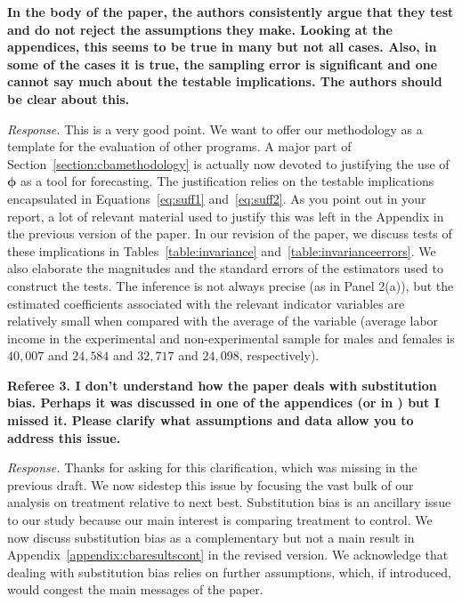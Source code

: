 \noindent \textbf{In the body of the paper, the authors consistently argue that they test and do not reject the assumptions they make. Looking at the appendices, this seems to be true in many but not all cases. Also, in some of the cases it is true, the sampling error is significant and one cannot say much about the testable implications. The authors should be clear about this.}

\noindent \textit{Response.} This is a very good point. We want to offer our methodology as a template for the evaluation of other programs. A major part of Section~\ref{section:cbamethodology} is actually now devoted to justifying the use of $\bm{\phi}$ as a tool for forecasting. The justification relies on the testable implications encapsulated in Equations~\eqref{eq:suff1} and~\eqref{eq:suff2}. As you point out in your report, a lot of relevant material used to justify this was left in the Appendix in the previous version of the paper. In our revision of the paper, we discuss tests of these implications in Tables~\ref{table:invariance} and~\ref{table:invarianceerrors}. We also elaborate the magnitudes and the standard errors of the estimators used to construct the tests. The inference is not always precise (as in Panel 2(a)), but the estimated coefficients associated with the relevant indicator variables are relatively small when compared with the average of the variable (average labor income in the experimental and non-experimental sample for males and females is $40,007$ and $24,584$ and  $32,717$ and $24,098$, respectively).

\noindent \textbf{Referee 3. I don't understand how the paper deals with substitution bias. Perhaps it was discussed in one of the appendices (or in \citet{Garcia_Heckman_Ziff_2017_Gender-Diff_UNPUBLISHED}) but I missed it. Please clarify what assumptions and data allow you to address this issue.}

\noindent \textit{Response.} Thanks for asking for this clarification, which was missing in the previous draft. We now sidestep this issue by focusing the vast bulk of our analysis on treatment relative to next best. Substitution bias is an ancillary issue to our study because our main interest is comparing treatment to control. We now discuss substitution bias as a complementary but not a main result in Appendix~\ref{appendix:cbaresultscont} in the revised version. We acknowledge that dealing with substitution bias relies on further assumptions, which, if introduced, would congest the main messages of the paper.

